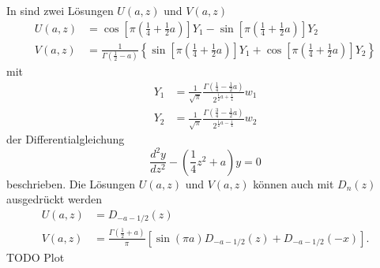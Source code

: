 In \cite{parzyl:abramowitz-stegun} sind zwei Lösungen $U(a, z)$ und $V(a,z)$ 
\begin{align}
    U(a,z) &= 
    \cos\left[\pi \left({\textstyle \frac{1}{4}} + {\textstyle \frac{1}{2}} a\right)\right] Y_1
    - \sin\left[\pi \left({\textstyle \frac{1}{4}} + {\textstyle \frac{1}{2}} a\right)\right] Y_2 \\
    V(a,z) &= \frac{1}{\Gamma \left({\textstyle \frac{1}{2} - a}\right)} \left\{
    \sin\left[\pi \left({\textstyle \frac{1}{4}} + {\textstyle \frac{1}{2}} a\right)\right] Y_1
    + \cos\left[\pi \left({\textstyle \frac{1}{4}} + {\textstyle \frac{1}{2}} a\right)\right] Y_2
    \right\}
\end{align}
mit
\begin{align}
    Y_1 &= \frac{1}{\sqrt{\pi}} 
            \frac{\Gamma\left({\textstyle \frac{1}{4} - 
            {\textstyle \frac{1}{2}}a}\right)}
            {2^{\frac{1}{2} a + \frac{1}{4}}} w_1\\
    Y_2 &= \frac{1}{\sqrt{\pi}} 
            \frac{\Gamma\left({\textstyle \frac{3}{4} - 
            {\textstyle \frac{1}{2}}a}\right)}
            {2^{\frac{1}{2} a - \frac{1}{4}}} w_2
\end{align}
der Differentialgleichung
\begin{equation}
    \frac{d^2 y}{d z^2} - \left(\frac{1}{4} z^2 + a\right) y = 0
\end{equation}
beschrieben. Die Lösungen $U(a,z)$ und $V(a, z)$ können auch mit $D_n(z)$
ausgedrückt werden
\begin{align}
    U(a,z) &= D_{-a-1/2}(z) \\
    V(a,z) &= \frac{\Gamma \left({\textstyle \frac{1}{2}} + a\right)}{\pi}
    \left[\sin\left(\pi a\right) D_{-a-1/2}(z) + D_{-a-1/2}(-x)\right].
\end{align}
TODO Plot